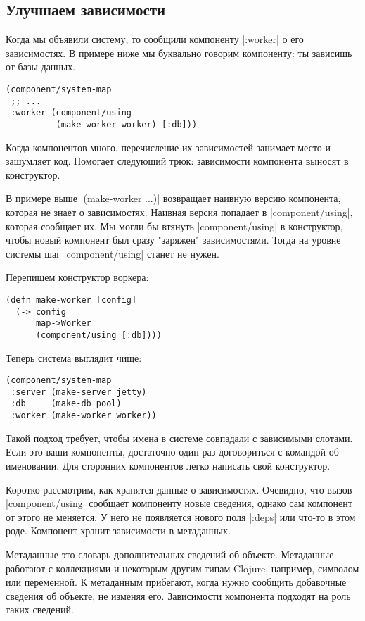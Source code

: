 \subsection{Улучшаем зависимости}

Когда мы объявили систему, то сообщили компоненту \spverb|:worker| о его
зависимостях. В примере ниже мы буквально говорим компоненту: ты зависишь от
базы данных.

\begin{verbatim}
(component/system-map
 ;; ...
 :worker (component/using
          (make-worker worker) [:db]))
\end{verbatim}

Когда компонентов много, перечисление их зависимостей занимает место и зашумляет
код. Помогает следующий трюк: зависимости компонента выносят в конструктор.

В примере выше \spverb|(make-worker {...})| возвращает наивную версию компонента,
которая не знает о зависимостях. Наивная версия попадает в \spverb|component/using|,
которая сообщает их. Мы могли бы втянуть \spverb|component/using| в конструктор, чтобы
новый компонент был сразу "заряжен" зависимостями. Тогда на уровне системы шаг
\spverb|component/using| станет не нужен.

Перепишем конструктор воркера:

\begin{verbatim}
(defn make-worker [config]
  (-> config
      map->Worker
      (component/using [:db])))
\end{verbatim}

Теперь система выглядит чище:

\begin{verbatim}
(component/system-map
 :server (make-server jetty)
 :db     (make-db pool)
 :worker (make-worker worker))
\end{verbatim}

Такой подход требует, чтобы имена в системе совпадали с зависимыми слотами. Если
это ваши компоненты, достаточно один раз договориться с командой об
именовании. Для сторонних компонентов легко написать свой конструктор.

Коротко рассмотрим, как хранятся данные о зависимостях. Очевидно, что вызов
\spverb|component/using| сообщает компоненту новые сведения, однако сам компонент от
этого не меняется. У него не появляется нового поля \spverb|:deps| или что-то в этом
роде. Компонент хранит зависимости в метаданных.

Метаданные это словарь дополнительных сведений об объекте. Метаданные работают с
коллекциями и некоторым другим типам Clojure, например, символом или
переменной. К метаданным прибегают, когда нужно сообщить добавочные сведения об
объекте, не изменяя его. Зависимости компонента подходят на роль таких сведений.

